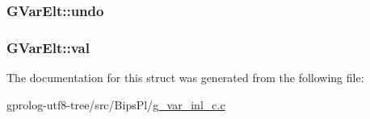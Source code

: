 \subsubsection[{\texorpdfstring{undo}{undo}}]{ G\+Var\+Elt\+::undo}\hypertarget{structGVarElt_a2c5c97b5670810ddda1590885bdede42}{}\label{structGVarElt_a2c5c97b5670810ddda1590885bdede42}
\subsubsection[{\texorpdfstring{val}{val}}]{ G\+Var\+Elt\+::val}\hypertarget{structGVarElt_a504e22949f6283a81b42cd76a0016c63}{}\label{structGVarElt_a504e22949f6283a81b42cd76a0016c63}


The documentation for this struct was generated from the following file\+:\begin{DoxyCompactItemize}
\item 
gprolog-\/utf8-\/tree/src/\+Bips\+Pl/\hyperlink{g__var__inl__c_8c}{g\+\_\+var\+\_\+inl\+\_\+c.\+c}\end{DoxyCompactItemize}

